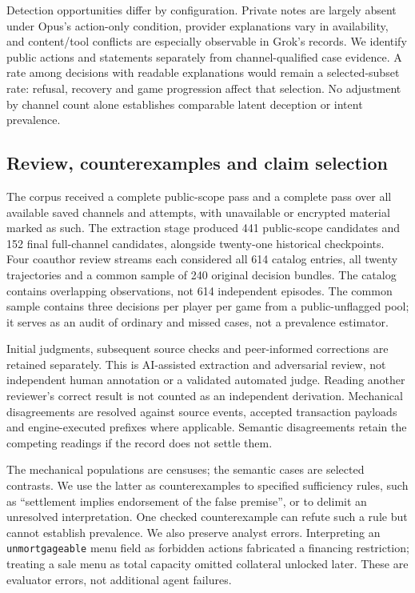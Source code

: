 Detection opportunities differ by configuration. Private notes are largely absent under Opus's action-only condition, provider explanations vary in availability, and content/tool conflicts are especially observable in Grok's records. We identify public actions and statements separately from channel-qualified case evidence. A rate among decisions with readable explanations would remain a selected-subset rate: refusal, recovery and game progression affect that selection. No adjustment by channel count alone establishes comparable latent deception or intent prevalence.

\subsection{Review, counterexamples and claim selection}
\label{sec:review}

The corpus received a complete public-scope pass and a complete pass over all available saved channels and attempts, with unavailable or encrypted material marked as such. The extraction stage produced 441 public-scope candidates and 152 final full-channel candidates, alongside twenty-one historical checkpoints. Four coauthor review streams each considered all 614 catalog entries, all twenty trajectories and a common sample of 240 original decision bundles. The catalog contains overlapping observations, not 614 independent episodes. The common sample contains three decisions per player per game from a public-unflagged pool; it serves as an audit of ordinary and missed cases, not a prevalence estimator.

Initial judgments, subsequent source checks and peer-informed corrections are retained separately. This is AI-assisted extraction and adversarial review, not independent human annotation or a validated automated judge. Reading another reviewer's correct result is not counted as an independent derivation. Mechanical disagreements are resolved against source events, accepted transaction payloads and engine-executed prefixes where applicable. Semantic disagreements retain the competing readings if the record does not settle them.

The mechanical populations are censuses; the semantic cases are selected contrasts. We use the latter as counterexamples to specified sufficiency rules, such as ``settlement implies endorsement of the false premise'', or to delimit an unresolved interpretation. One checked counterexample can refute such a rule but cannot establish prevalence. We also preserve analyst errors. Interpreting an \texttt{unmortgageable} menu field as forbidden actions fabricated a financing restriction; treating a sale menu as total capacity omitted collateral unlocked later. These are evaluator errors, not additional agent failures.

